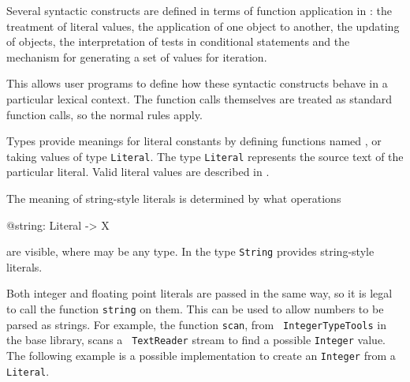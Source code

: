 {}

Several syntactic constructs are defined in terms of function
application in \asharp{}:
the treatment of literal values,
the application of one object to another,
the updating of objects,
the interpretation of tests in conditional statements and
the mechanism for generating a set of values for iteration.

This allows user programs to define how these syntactic constructs
behave in a particular lexical context. The function calls themselves
are treated as standard function calls, so the normal rules apply.



Types provide meanings for literal constants by defining
functions named ,  or 
taking values of type \verb+Literal+. The type {\tt Literal}
represents the source text of the particular literal. Valid literal
values are described in .

The meaning of string-style literals is determined by what operations

\begin{tt}
\verb@    @string: Literal -> X
\end{tt}

are visible, where  may be any type.
In \libaldor{}
the type \verb"String" provides string-style literals.

Both integer and floating point literals are passed in the same way,
so it is legal to call the function {\tt string} on them.
This can be used to allow numbers to be parsed as
strings. For example, the function \verb"scan", from {\tt
IntegerTypeTools} in the \asharp{} base library, scans a {\tt
TextReader} stream to find a possible {\tt Integer} value.
The following example is a possible implementation to
create an {\tt Integer} from a {\tt Literal}.

